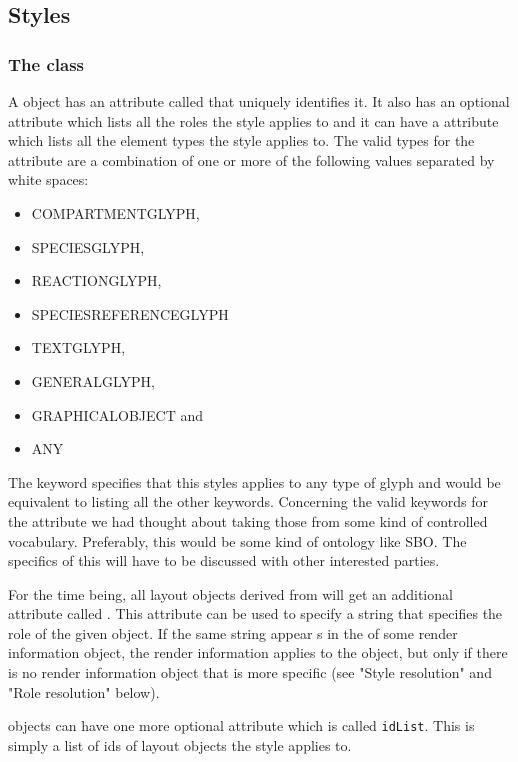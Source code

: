 \subsection{Styles}
\label{style-class}

\subsubsection{The \LocalStyle class}
\label{localstyle-class}
A \LocalStyle object has an attribute called  that uniquely identifies it. It also has an optional  attribute which lists all the roles 
the style applies to and it can have a  attribute which lists 
all the element types the style applies to. The valid types for the 
 attribute are a combination of one or more of the following 
values separated by white spaces:

\begin{itemize}
 \item COMPARTMENT\-GLYPH,
 \item SPECIES\-GLYPH,
 \item REACTION\-GLYPH, 
 \item SPECIES\-REFERENCE\-GLYPH
 \item TEXT\-GLYPH, 
 \item GENERAL\-GLYPH, 
 \item GRAPHICAL\-OBJECT and 
 \item ANY
\end{itemize}

The  keyword specifies that this styles applies to any type of glyph and 
would be equivalent to listing all the other keywords. Concerning the valid 
keywords for the  attribute we had thought about taking those 
from some kind of controlled vocabulary. Preferably, this would be some kind of 
ontology like SBO. The specifics of this will have to be discussed with other 
interested parties. 

For the time being, all layout objects derived from \GraphicalObject
will get an additional attribute called . This attribute can be used
to specify a string that specifies the role of the given object. If the same string appear
s in the  of some render information object, the render information 
applies to the object, but only if there is no render information object that is more
specific (see "Style resolution" and "Role resolution" below). 

\LocalStyle objects can have one more optional attribute 
which is called \texttt{idList}. This is simply a list of ids of layout objects the style applies to.

